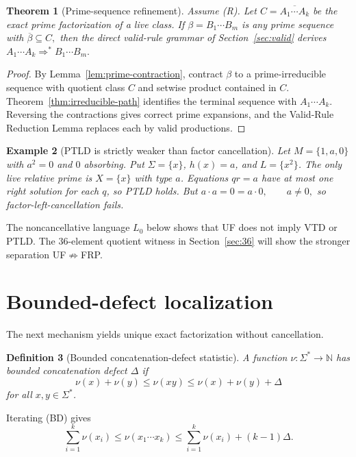\documentclass[11pt,a4paper]{article}
\newtheorem{theorem}{Theorem}[section]
\newtheorem{definition}[theorem]{Definition}
\newtheorem{example}[theorem]{Example}
\newcommand{\Nat}{\mathbb N}
\begin{document}
\begin{theorem}[Prime-sequence refinement]
\label{thm:prime-refinement}
Assume \textup{(R)}.  Let \(C=\overline{A_1\cdots A_k}\) be the exact prime factorization of a live class.  If $\beta=B_1\cdots B_m$ is any prime sequence with
\(\overline\beta\subseteq C,\)
then the direct valid-rule grammar of Section~\ref{sec:valid} derives
\(A_1\cdots A_k\Rightarrow^* B_1\cdots B_m.\)
\end{theorem}

\begin{proof}
By Lemma~\ref{lem:prime-contraction}, contract $\beta$ to a prime-irreducible sequence with quotient class $C$ and setwise product contained in $C$.  Theorem~\ref{thm:irreducible-path} identifies the terminal sequence with $A_1\cdots A_k$.  Reversing the contractions gives correct prime expansions, and the Valid-Rule Reduction Lemma replaces each by valid productions.
\end{proof}

\begin{example}[PTLD is strictly weaker than factor cancellation]
\label{ex:ptld-not-cancel}
Let $M=\{1,a,0\}$ with $a^2=0$ and $0$ absorbing.  Put $\Sigma=\{x\}$, $h(x)=a$, and $L=\{x^2\}$.  The only live relative prime is $X=\{x\}$ with type $a$.  Equations $qr=a$ have at most one right solution for each $q$, so PTLD holds.  But
\(a\cdot a=0=a\cdot0, \qquad a\ne0,\)
so factor-left-cancellation fails.
\end{example}

The noncancellative language $L_0$ below shows that UF does not imply VTD or PTLD.  The $36$-element quotient witness in Section~\ref{sec:36} will show the stronger separation UF$\not\Rightarrow$FRP.

\section{Bounded-defect localization}
\label{sec:defect}

The next mechanism yields unique exact factorization without cancellation.

\begin{definition}[Bounded concatenation-defect statistic]
A function $\nu:\Sigma^*\to\Nat$ has bounded concatenation defect $\Delta$ if
\[
  \nu(x)+\nu(y)
  \le \nu(xy)
  \le \nu(x)+\nu(y)+\Delta
  \tag{BD}
\]
for all $x,y\in\Sigma^*$.
\end{definition}

Iterating (BD) gives
\begin{equation}
  \sum_{i=1}^k\nu(x_i)
  \le
  \nu(x_1\cdots x_k)
  \le
  \sum_{i=1}^k\nu(x_i)+(k-1)\Delta.
  \label{eq:defect-iteration}
\end{equation}
\end{document}
